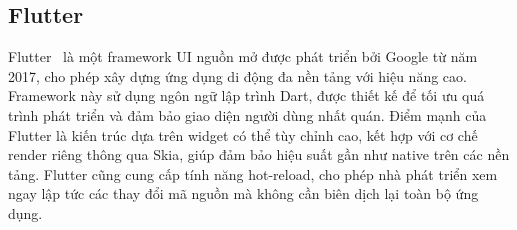 

    

\subsection{Flutter}
Flutter~\cite{flutterdoc} là một framework UI nguồn mở được phát triển bởi Google từ năm 2017, cho phép xây dựng ứng dụng di động đa nền tảng với hiệu năng cao. Framework này sử dụng ngôn ngữ lập trình Dart, được thiết kế để tối ưu quá trình phát triển và đảm bảo giao diện người dùng nhất quán. Điểm mạnh của Flutter là kiến trúc dựa trên widget có thể tùy chỉnh cao, kết hợp với cơ chế render riêng thông qua Skia, giúp đảm bảo hiệu suất gần như native trên các nền tảng. Flutter cũng cung cấp tính năng hot-reload, cho phép nhà phát triển xem ngay lập tức các thay đổi mã nguồn mà không cần biên dịch lại toàn bộ ứng dụng.

